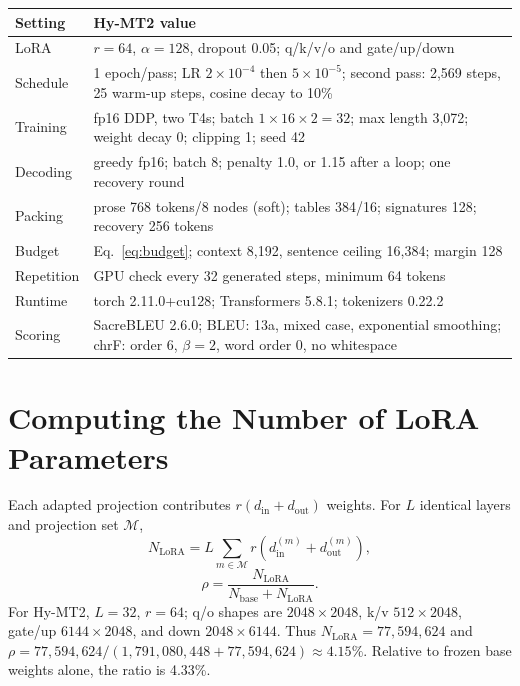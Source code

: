 \documentclass[11pt]{article}
\begin{document}
\noindent\begin{minipage}{\columnwidth}
\centering\small
\begin{tabularx}{\columnwidth}{@{}lX@{}}
\toprule
Setting & Hy-MT2 value \\
\midrule
LoRA & $r=64$, $\alpha=128$, dropout 0.05; q/k/v/o and gate/up/down \\
Schedule & 1 epoch/pass; LR $2\!\times\!10^{-4}$ then $5\!\times\!10^{-5}$; second pass: 2,569 steps, 25 warm-up steps, cosine decay to 10\% \\
Training & fp16 DDP, two T4s; batch $1\!\times\!16\!\times\!2=32$; max length 3,072; weight decay 0; clipping 1; seed 42 \\
Decoding & greedy fp16; batch 8; penalty 1.0, or 1.15 after a loop; one recovery round \\
Packing & prose 768 tokens/8 nodes (soft); tables 384/16; signatures 128; recovery 256 tokens \\
Budget & Eq.~\eqref{eq:budget}; context 8,192, sentence ceiling 16,384; margin 128 \\
Repetition & GPU check every 32 generated steps, minimum 64 tokens \\
Runtime & torch 2.11.0+cu128; Transformers 5.8.1; tokenizers 0.22.2 \\
Scoring & SacreBLEU 2.6.0; BLEU: 13a, mixed case, exponential smoothing; chrF: order 6, $\beta=2$, word order 0, no whitespace \\
\bottomrule
\end{tabularx}
\label{tab:hyper}
\end{minipage}

\section{Computing the Number of LoRA Parameters}\label{app:lora}
Each adapted projection contributes $r(d_{\mathrm{in}}+d_{\mathrm{out}})$ weights. For $L$ identical layers and projection set $\mathcal{M}$,
\begin{equation}
N_{\mathrm{LoRA}}=L\sum_{m\in\mathcal{M}}r(d_{\mathrm{in}}^{(m)}+d_{\mathrm{out}}^{(m)}),
\end{equation}
\begin{equation}
\rho=\frac{N_{\mathrm{LoRA}}}{N_{\mathrm{base}}+N_{\mathrm{LoRA}}}.
\end{equation}
For Hy-MT2, $L=32$, $r=64$; q/o shapes are $2048\!\times\!2048$, k/v $512\!\times\!2048$, gate/up $6144\!\times\!2048$, and down $2048\!\times\!6144$. Thus $N_{\mathrm{LoRA}}=77{,}594{,}624$ and $\rho=77{,}594{,}624/(1{,}791{,}080{,}448+77{,}594{,}624)\approx4.15\%$. Relative to frozen base weights alone, the ratio is 4.33\%.
\end{document}

